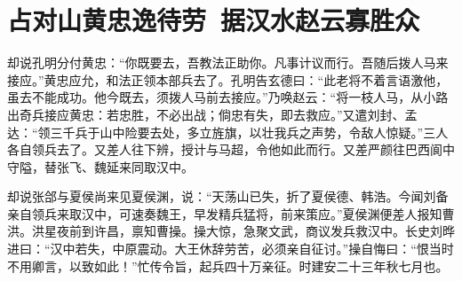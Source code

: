 \chapter{占对山黄忠逸待劳~据汉水赵云寡胜众}

却说孔明分付黄忠：“你既要去，吾教法正助你。凡事计议而行。吾随后拨人马来接应。”黄忠应允，和法正领本部兵去了。孔明告玄德曰：“此老将不着言语激他，虽去不能成功。他今既去，须拨人马前去接应。”乃唤赵云：“将一枝人马，从小路出奇兵接应黄忠：若忠胜，不必出战；倘忠有失，即去救应。”又遣刘封、孟达：“领三千兵于山中险要去处，多立旌旗，以壮我兵之声势，令敌人惊疑。”三人各自领兵去了。又差人往下辨，授计与马超，令他如此而行。又差严颜往巴西阆中守隘，替张飞、魏延来同取汉中。

却说张郃与夏侯尚来见夏侯渊，说：“天荡山已失，折了夏侯德、韩浩。今闻刘备亲自领兵来取汉中，可速奏魏王，早发精兵猛将，前来策应。”夏侯渊便差人报知曹洪。洪星夜前到许昌，禀知曹操。操大惊，急聚文武，商议发兵救汉中。长史刘晔进曰：“汉中若失，中原震动。大王休辞劳苦，必须亲自征讨。”操自悔曰：“恨当时不用卿言，以致如此！”忙传令旨，起兵四十万亲征。时建安二十三年秋七月也。

